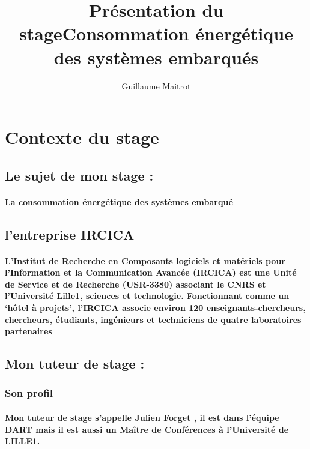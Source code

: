 \documentclass[a4paper]{article}
\title{Présentation du stage}
\author{Guillaume Maitrot}
\begin{document}
\maketitle

\begin{center}
\centering
\title{Consommation énergétique des systèmes embarqués}
\end{center}

\section{Contexte du stage}

\subsection{Le sujet de mon stage :}
\paragraph{La consommation énergétique des systèmes embarqué }

\subsection{l'entreprise IRCICA}
\paragraph{L’Institut de Recherche en Composants logiciels et matériels pour l’Information et la Communication Avancée (IRCICA) est une Unité de Service et de Recherche (USR-3380) associant le CNRS et l’Université Lille1, sciences et technologie.
Fonctionnant comme un ‘hôtel à projets’, l’IRCICA associe environ 120 enseignants-chercheurs, chercheurs, étudiants, ingénieurs et techniciens de quatre laboratoires partenaires}

\subsection{Mon tuteur de stage :}
\subsubsection{Son profil}
    \paragraph{Mon tuteur de stage s’appelle Julien Forget , il est dans l’équipe DART mais il est aussi un Maître de Conférences à l'Université de LILLE1.}
    
\end{document}
